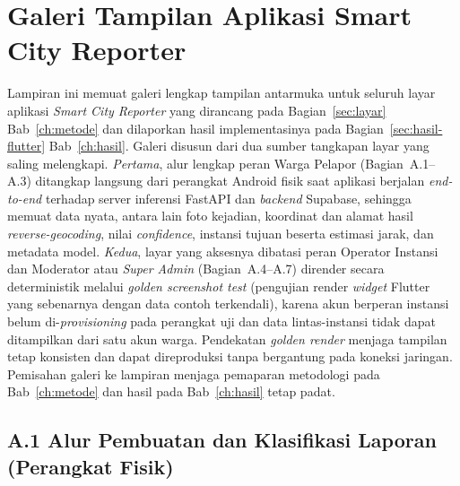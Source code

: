 \chapter{Galeri Tampilan Aplikasi Smart City Reporter}
\label{app:ui-mockup}

Lampiran ini memuat galeri lengkap tampilan antarmuka untuk seluruh layar aplikasi \textit{Smart City Reporter} yang dirancang pada Bagian~\ref{sec:layar} Bab~\ref{ch:metode} dan dilaporkan hasil implementasinya pada Bagian~\ref{sec:hasil-flutter} Bab~\ref{ch:hasil}. Galeri disusun dari dua sumber tangkapan layar yang saling melengkapi. \emph{Pertama}, alur lengkap peran Warga Pelapor (Bagian~A.1--A.3) ditangkap langsung dari perangkat Android fisik saat aplikasi berjalan \textit{end-to-end} terhadap server inferensi FastAPI dan \textit{backend} Supabase, sehingga memuat data nyata, antara lain foto kejadian, koordinat dan alamat hasil \textit{reverse-geocoding}, nilai \textit{confidence}, instansi tujuan beserta estimasi jarak, dan metadata model. \emph{Kedua}, layar yang aksesnya dibatasi peran Operator Instansi dan Moderator atau \textit{Super Admin} (Bagian~A.4--A.7) dirender secara deterministik melalui \textit{golden screenshot test} (pengujian render \textit{widget} Flutter yang sebenarnya dengan data contoh terkendali), karena akun berperan instansi belum di-\textit{provisioning} pada perangkat uji dan data lintas-instansi tidak dapat ditampilkan dari satu akun warga. Pendekatan \textit{golden render} menjaga tampilan tetap konsisten dan dapat direproduksi tanpa bergantung pada koneksi jaringan. Pemisahan galeri ke lampiran menjaga pemaparan metodologi pada Bab~\ref{ch:metode} dan hasil pada Bab~\ref{ch:hasil} tetap padat.

\section*{A.1 Alur Pembuatan dan Klasifikasi Laporan (Perangkat Fisik)}

